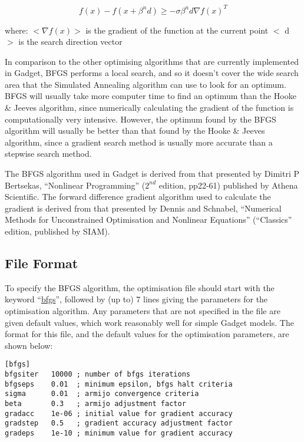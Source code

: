 \documentclass[]{book}
\begin{document}
\begin{equation}
\label{eq:armijo}
f(x) - f(x + \beta^{n}d) \geq - \sigma \beta^{n}d \nabla f(x) ^{T}\end{equation}

where: \(<\nabla f(x)>\) is the gradient of the function at the current
point \(<\) d \(>\) is the search direction vector

In comparison to the other optimising algorithms that are currently
implemented in Gadget, BFGS performs a local search, and so it doesn't
cover the wide search area that the Simulated Annealing algorithm can
use to look for an optimum. BFGS will usually take more computer time to
find an optimum than the Hooke \& Jeeves algorithm, since numerically
calculating the gradient of the function is computationally very
intensive. However, the optimum found by the BFGS algorithm will usually
be better than that found by the Hooke \& Jeeves algorithm, since a
gradient search method is usually more accurate than a stepwise search
method.

The BFGS algorithm used in Gadget is derived from that presented by
Dimitri P Bertsekas, ``Nonlinear Programming'' (\(2^{nd}\) edition, pp22-61)
published by Athena Scientific. The forward difference gradient
algorithm used to calculate the gradient is derived from that presented
by Dennis and Schnabel, ``Numerical Methods for Unconstrained
Optimisation and Nonlinear Equations'' (``Classics'' edition, published by
SIAM).

\hypertarget{subsec:bfgsfile}{%
\subsection{File Format}\label{subsec:bfgsfile}}

To specify the BFGS algorithm, the optimisation file should start with
the keyword ``\protect\hyperlink{sec:bfgs}{bfgs}'', followed by (up to) 7 lines giving the
parameters for the optimisation algorithm. Any parameters that are not
specified in the file are given default values, which work reasonably
well for simple Gadget models. The format for this file, and the default
values for the optimisation parameters, are shown below:

\begin{verbatim}
[bfgs]
bfgsiter   10000 ; number of bfgs iterations
bfgseps    0.01  ; minimum epsilon, bfgs halt criteria
sigma      0.01  ; armijo convergence criteria
beta       0.3   ; armijo adjustment factor
gradacc    1e-06 ; initial value for gradient accuracy
gradstep   0.5   ; gradient accuracy adjustment factor
gradeps    1e-10 ; minimum value for gradient accuracy
\end{verbatim}
\end{document}
